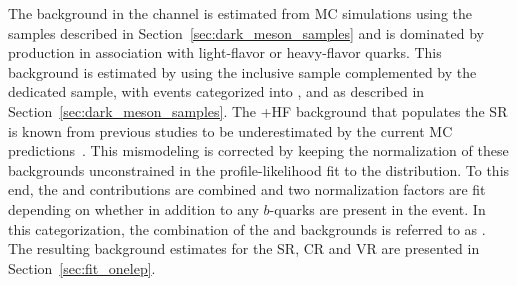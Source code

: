 The background in the \onelep channel is estimated from MC simulations using the samples described in Section~\ref{sec:dark_meson_samples} and is dominated by \ttbar production in association with light-flavor or heavy-flavor quarks. This background is estimated by using the inclusive \ttbar sample complemented by the dedicated \ttbb sample, with events categorized into \ttb, \ttc and \ttlight as described in Section~\ref{sec:dark_meson_samples}. The \ttbar+HF background that populates the SR is known from previous studies to be underestimated by the current MC predictions~\cite{TOPQ-2017-12}. This mismodeling is corrected by keeping the normalization of these backgrounds unconstrained in the profile-likelihood fit to the \dave distribution. To this end, the \ttc and \ttlight contributions are combined and two normalization factors are fit depending on whether in addition to \ttbar any $b$-quarks are present in the event. In this categorization, the combination of the \ttc and \ttlight backgrounds is referred to as \ttnb. The resulting background estimates for the SR, CR and VR are presented in Section~\ref{sec:fit_onelep}.

